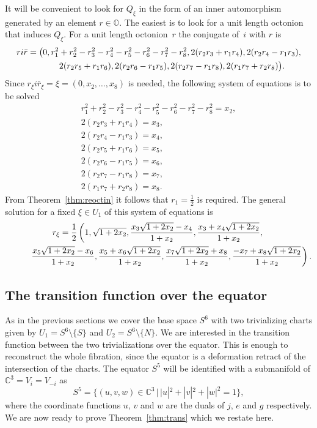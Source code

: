 \documentclass[pdftex]{sigma}
\numberwithin{equation}{section}
\newcommand{\SO}{\mathbb{O}} %
\begin{document}
It will be convenient to look for $Q_\xi$ in the form of an inner automorphism generated by an element $r \in \SO$. The easiest is to look for a unit length octonion that induces $Q_\xi$. For a unit length octonion~$r$ the conjugate of~$i$ with $r$ is
\begin{gather*} ri\bar{r}=\big(0,r_1^2+r_2^2-r_3^2-r_4^2-r_5^2-r_6^2-r_7^2-r_8^2,2(r_2r_3+r_1r_4),2(r_2r_4-r_1r_3),\\
\hphantom{ri\bar{r}=\big(}{} 2(r_2r_5+r_1r_6),2(r_2r_6-r_1r_5),2(r_2r_7-r_1r_8),2(r_1r_7+r_2r_8)\big).\end{gather*}
Since $r_\xi i\bar{r}_\xi=\xi=(0,x_2,\dots,x_8)$ is needed, the following system of equations is to be solved
\begin{gather*}
r_1^2+r_2^2-r_3^2-r_4^2-r_5^2-r_6^2-r_7^2-r_8^2 = x_2,\\
2(r_2r_3+r_1r_4) = x_3, \\
2(r_2r_4-r_1r_3) = x_4, \\
2(r_2r_5+r_1r_6) = x_5, \\
2(r_2r_6-r_1r_5) = x_6, \\
2(r_2r_7-r_1r_8) = x_7, \\
2(r_1r_7+r_2r_8) = x_8.
\end{gather*}
From Theorem~\ref{thm:reoctin} it follows that $r_1=\frac{1}{2}$ is required. The general solution for a fixed $\xi \in U_1$ of this system of equations is
\begin{gather}
r_\xi= \frac{1}{2}\left(1, \sqrt{1+2x_2},\frac{x_3\sqrt{1+2x_2}-x_4}{1+x_2},\frac{x_3+x_4\sqrt{1+2x_2}}{1+x_2}, \right.\nonumber\\
\left.\hphantom{r_\xi= \frac{1}{2}}{}\frac{x_5\sqrt{1+2x_2}-x_6}{1+x_2},\frac{x_5+x_6\sqrt{1+2x_2}}{1+x_2},\frac{x_7\sqrt{1 + 2 x_2} + x_8}{1+x_2},\frac{-x_7 + x_8\sqrt{1 + 2 x_2}}{1+x_2}\right).\label{eq:octhopfsol}
\end{gather}

\subsection{The transition function over the equator}\label{section3.2}
As in the previous sections we cover the base space $S^6$ with two trivializing charts given by $U_1=S^6 {\setminus} \{S\} $ and $U_2=S^6 {\setminus} \{N\}$.
We are interested in the transition function between the two trivializations over the equator. This is enough to reconstruct the whole fibration, since the equator is a deformation retract of the intersection of the charts. The equator $S^5$ will be identified with a submanifold of $\mathbb{C}^3=V_i=V_{-i}$ as
\[ S^5=\big\{(u,v,w) \in \mathbb{C}^3 \,|\, |u|^2+|v|^2+|w|^2=1\big\}, \]
where the coordinate functions $u$, $v$ and $w$ are the duals of $j$, $e$ and $g$ respectively. We are now ready to prove Theorem~\ref{thm:trans} which we restate here.
\end{document}
